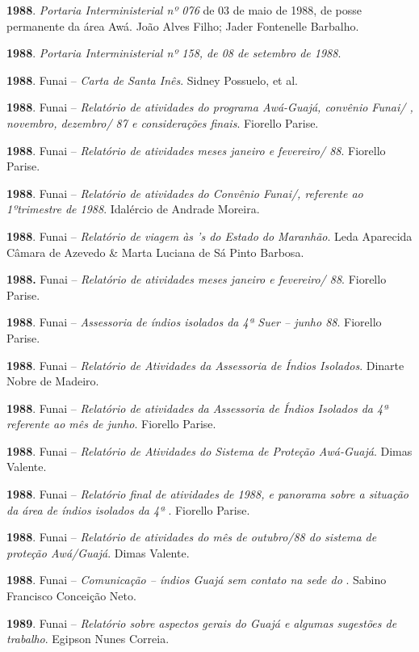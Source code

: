 \textbf{1988}. \emph{Portaria Interministerial nº 076} de 03 de maio de
1988, de posse permanente da área Awá. João Alves Filho; Jader
Fontenelle Barbalho.

\textbf{1988}. \emph{Portaria Interministerial nº 158, de 08 de setembro
de 1988}.

\textbf{1988}. Funai -- \emph{Carta de Santa Inês}. Sidney Possuelo, et
al.

\textbf{1988}. Funai -- \emph{Relatório de atividades do programa
Awá-Guajá, convênio Funai/ , novembro, dezembro/ 87 e considerações
finais}. Fiorello Parise.

\textbf{1988}. Funai -- \emph{Relatório de atividades meses janeiro e
fevereiro/ 88}. Fiorello Parise.

\textbf{1988}. Funai -- \emph{Relatório de atividades do Convênio
Funai/, referente ao 1ºtrimestre de 1988}. Idalércio de Andrade
Moreira.

\textbf{1988}. Funai -- \emph{Relatório de viagem às 's do Estado do
Maranhão}. Leda Aparecida Câmara de Azevedo \& Marta Luciana de Sá Pinto
Barbosa.

\textbf{1988.} Funai -- \emph{Relatório de atividades meses janeiro e
fevereiro/ 88}. Fiorello Parise.

\textbf{1988}. Funai -- \emph{Assessoria de índios isolados da 4ª Suer
-- junho 88}. Fiorello Parise.

\textbf{1988}. Funai -- \emph{Relatório de Atividades da Assessoria de
Índios Isolados}. Dinarte Nobre de Madeiro.

\textbf{1988}. Funai -- \emph{Relatório de atividades da Assessoria de
Índios Isolados da 4ª  referente ao mês de junho}. Fiorello Parise.

\textbf{1988}. Funai -- \emph{Relatório de Atividades do Sistema de
Proteção Awá-Guajá}. Dimas Valente.

\textbf{1988}. Funai -- \emph{Relatório final de atividades de 1988, e
panorama sobre a situação da área de índios isolados da 4ª }.
Fiorello Parise.

\textbf{1988}. Funai -- \emph{Relatório} \emph{de atividades do mês de
outubro/88 do sistema de proteção Awá/Guajá}. Dimas Valente.

\textbf{1988}. Funai -- \emph{Comunicação -- índios Guajá sem contato na
sede do }. Sabino Francisco Conceição Neto.

\textbf{1989}. Funai -- \emph{Relatório sobre aspectos gerais do 
Guajá e algumas sugestões de trabalho}. Egipson Nunes Correia.


